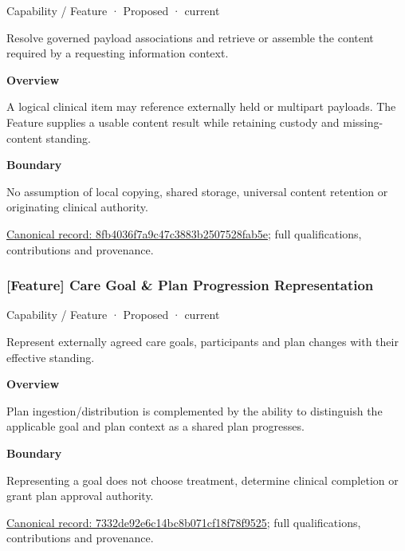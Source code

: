\label{element:8fb4036f7a9c47c3883b2507528fab5e}
{\small Capability / Feature · Proposed · current}\par

Resolve governed payload associations and retrieve or assemble the content required by a requesting information context.



\textbf{Overview}



A logical clinical item may reference externally held or multipart payloads. The Feature supplies a usable content result while retaining custody and missing-content standing.



\textbf{Boundary}



No assumption of local copying, shared storage, universal content retention or originating clinical authority.


{\footnotesize \href{../../../../continuum/strategy/capability/feature/8fb4036f7a9c47c3883b2507528fab5e.md}{Canonical record: 8fb4036f7a9c47c3883b2507528fab5e}; full qualifications, contributions and provenance.}\par
\subsubsection{[Feature] Care Goal \& Plan Progression Representation}

\label{element:7332de92e6c14bc8b071cf18f78f9525}
{\small Capability / Feature · Proposed · current}\par

Represent externally agreed care goals, participants and plan changes with their effective standing.



\textbf{Overview}



Plan ingestion/distribution is complemented by the ability to distinguish the applicable goal and plan context as a shared plan progresses.



\textbf{Boundary}



Representing a goal does not choose treatment, determine clinical completion or grant plan approval authority.


{\footnotesize \href{../../../../continuum/strategy/capability/feature/7332de92e6c14bc8b071cf18f78f9525.md}{Canonical record: 7332de92e6c14bc8b071cf18f78f9525}; full qualifications, contributions and provenance.}\par
